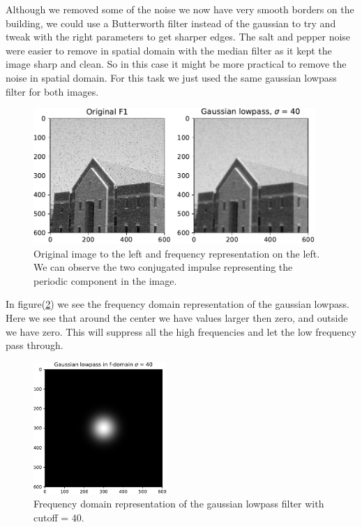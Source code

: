 {    Although we removed some of the noise we now have very smooth borders on the building, we could use a Butterworth filter instead of the gaussian to try and tweak with the right parameters to get sharper edges. The salt and pepper noise were easier to remove in spatial domain with the median filter as it kept the image sharp and clean. So in this case it might be more practical to remove the noise in spatial domain. For this task we just used the same gaussian lowpass filter for both images.

    \begin{figure}[H]
        {\centering
            \includegraphics[width=0.95\textwidth]{C41.pdf}
            \caption{Original image to the left and frequency representation on the left. We can observe the two conjugated impulse representing the periodic component in the image.}
            \label{task4pepper}
        \par}
        \end{figure}

In figure(\ref{gausf-dom}) we see the frequency domain representation of the gaussian lowpass. Here we see that around the center we have values larger then zero, and outside we have zero. This will suppress all the high frequencies and let the low frequency pass through.


\begin{figure}[H]
    {\centering
        \includegraphics[width=0.45\textwidth]{gausf-dom.pdf}
        \caption{Frequency domain representation of the gaussian lowpass filter with cutoff = 40.}
        \label{gausf-dom}
    \par}
    \end{figure}




}
